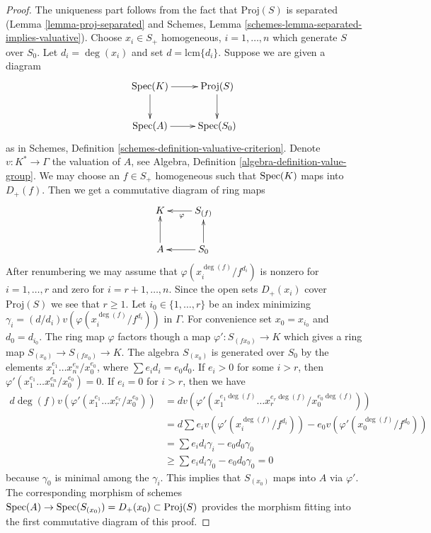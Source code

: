 \begin{proof}
The uniqueness part follows from the fact that $\text{Proj}(S)$ is
separated (Lemma \ref{lemma-proj-separated} and
Schemes, Lemma \ref{schemes-lemma-separated-implies-valuative}).
Choose $x_i \in S_{+}$ homogeneous, $i = 1, \ldots, n$
which generate $S$ over $S_0$. Let $d_i = \deg(x_i)$ and
set $d = \text{lcm}\{d_i\}$. Suppose we are given a diagram
$$
\xymatrix{
\Spec(K) \ar[r] \ar[d] & \text{Proj}(S) \ar[d] \\
\Spec(A) \ar[r] & \Spec(S_0)
}
$$
as in Schemes, Definition \ref{schemes-definition-valuative-criterion}.
Denote $v : K^* \to \Gamma$ the valuation of $A$, see
Algebra, Definition \ref{algebra-definition-value-group}.
We may choose an $f \in S_{+}$ homogeneous such that
$\mathop{\mathrm{Spec}}(K)$ maps into $D_{+}(f)$. Then we get a commutative
diagram of ring maps
$$
\xymatrix{
K & S_{(f)} \ar[l]^{\varphi} \\
A \ar[u] & S_0 \ar[l] \ar[u]
}
$$
After renumbering we may assume that $\varphi(x_i^{\deg(f)}/f^{d_i})$
is nonzero for $i = 1, \ldots, r$ and zero for $i = r + 1, \ldots, n$.
Since the open sets $D_{+}(x_i)$ cover $\text{Proj}(S)$ we see that $r \geq 1$.
Let $i_0 \in \{1, \ldots, r\}$ be an index minimizing
$\gamma_i = (d/d_i)v(\varphi(x_i^{\deg(f)}/f^{d_i}))$ in $\Gamma$.
For convenience set $x_0 = x_{i_0}$ and $d_0 = d_{i_0}$.
The ring map $\varphi$ factors though a map $\varphi' : S_{(fx_0)} \to K$
which gives a ring map $S_{(x_0)} \to S_{(fx_0)} \to K$.
The algebra $S_{(x_0)}$ is generated over $S_0$ by the elements
$x_1^{e_1} \ldots x_n^{e_n}/x_0^{e_0}$, where $\sum e_i d_i = e_0 d_0$.
If $e_i > 0$ for some $i > r$, then
$\varphi'(x_1^{e_1} \ldots x_n^{e_n}/x_0^{e_0}) = 0$.
If $e_i = 0$ for $i > r$, then we have
\begin{align*}
d \deg(f) v(\varphi'(x_1^{e_1} \ldots x_r^{e_r}/x_0^{e_0}))
& =
d v(\varphi'(x_1^{e_1 \deg(f)} \ldots x_r^{e_r \deg(f)}/x_0^{e_0 \deg(f)})) \\
& =
d \sum e_i v(\varphi'(x_i^{\deg(f)}/f^{d_i}))
- e_0 v(\varphi'(x_0^{\deg(f)}/f^{d_0})) \\
& =
\sum e_i d_i \gamma_i - e_0 d_0 \gamma_0 \\
& \geq
\sum e_i d_i \gamma_0 - e_0 d_0 \gamma_0 = 0
\end{align*}
because $\gamma_0$ is minimal among the $\gamma_i$.
This implies that $S_{(x_0)}$ maps into $A$ via $\varphi'$.
The corresponding morphism of schemes
$\mathop{\mathrm{Spec}}(A) \to \mathop{\mathrm{Spec}}(S_{(x_0)}) = D_{+}(x_0)
\subset \text{Proj}(S)$ provides the morphism fitting into
the first commutative diagram of this proof.
\end{proof}

